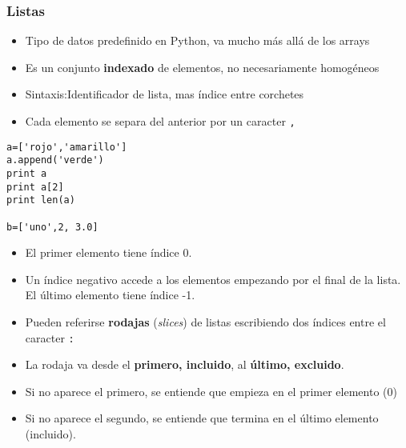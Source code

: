 \begin{frame}[fragile]
\frametitle{Listas}



\vspace{-6mm}
\begin{itemize}
\item Tipo de datos predefinido en Python, va mucho más allá de los
  arrays
\item Es un conjunto {\bf indexado} de elementos, no necesariamente homogéneos
\item Sintaxis:Identificador de lista, mas índice entre corchetes
\item Cada elemento se separa del anterior por un caracter \verb|,|
\end{itemize}
  \begin{footnotesize}
\begin{verbatim}
a=['rojo','amarillo']
a.append('verde')
print a
print a[2]
print len(a)

b=['uno',2, 3.0]

\end{verbatim}
  \end{footnotesize}

\end{frame}



\begin{frame}[fragile]

\begin{itemize}
\item El primer elemento tiene índice 0.
\item Un índice negativo accede a los elementos empezando por el final
  de la lista. El último elemento tiene índice -1.
\item Pueden referirse {\bf rodajas} (\emph{slices}) de listas
  escribiendo dos índices entre el caracter \verb|:|
\item La rodaja va desde el {\bf primero, incluido}, al {\bf último,
    excluido}.
\item Si no aparece el primero, se entiende que empieza en el primer
  elemento (0)
\item Si no aparece el segundo, se entiende que termina en el último
  elemento (incluido). 
\end{itemize}
\end{frame}


